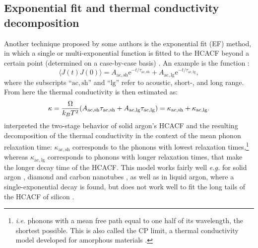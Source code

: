 \begin{LEtext}
\subsection{Exponential fit and thermal conductivity decomposition}  \label{sec:exp-fit-decomposition}
Another technique proposed by some authors is the exponential fit (EF) method, in which a single or multi-exponential function is fitted to the HCACF beyond a certain point (determined on a case-by-case basis) \cite{Che2000a,Li1998,Zhang2015}. An example is the function \cite{Che2000a}:
\begin{equation}
    \langle J(t) J(0) \rangle = A_{\mathrm{ac,sh}} \mathrm{e}^{-t/\tau_{\mathrm{ac,sh}}} + A_{\mathrm{ac,lg}} \mathrm{e}^{-t/\tau_{\mathrm{ac,lg}}},
\end{equation}
where the subscripts ``$\mathrm{ac,sh}$'' and ``$\mathrm{lg}$'' refer to acoustic, short-, and long range. From here the thermal conductivity is then estimated as:
\begin{equation}
    \kappa = \frac{\rOmega}{k_B T^2} (A_{\mathrm{ac,sh}}\tau_{\mathrm{ac,sh}} + A_{\mathrm{ac,lg}}\tau_{\mathrm{ac,lg}})  =  \kappa_{\mathrm{ac,sh}} + \kappa_{\mathrm{ac,lg}}. \label{eq:kappa-2exp-fit}
\end{equation}
\citet{McGaughey2004a} interpreted the two-stage behavior of solid argon's HCACF and the resulting decomposition of the thermal conductivity in the context of the mean phonon relaxation time: $\kappa_{\mathrm{ac,sh}}$ corresponds to the phonons with lowest relaxation times,\footnote{\emph{i.e.} phonons with a mean free path equal to one half of its wavelength, the shortest possible. This is also called the CP limit, a thermal conductivity model developed for amorphous materials \cite{Cahill1989,Cahill1992}.} whereas $\kappa_{\mathrm{ac,lg}}$ corresponds to phonons with longer relaxation times, that make the longer decay time of the HCACF.
This model works fairly well \emph{e.g.} for solid argon \cite{McGaughey2004a}, diamond and carbon nanotubes \cite{Che2000a,Che2000b}, as well as in liquid argon, where a single-exponential decay is found, but does not work well to fit the long tails of the HCACF of silicon \cite{Schelling2002}.


\end{LEtext}
